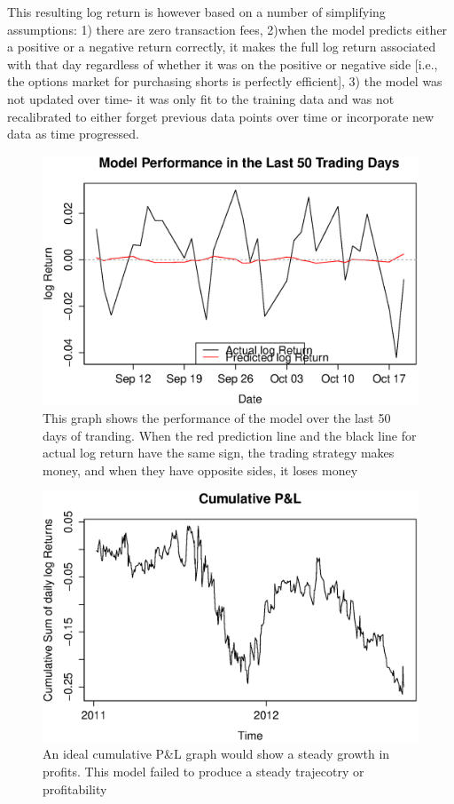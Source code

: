 \documentclass{article}
\begin{document}
This resulting log return is however based on a number of simplifying assumptions: 1) there are zero transaction fees, 2)when the model predicts either a positive or a negative return correctly, it makes the full log return associated with that day regardless of whether it was on the positive or negative side [i.e., the options market for purchasing shorts is perfectly efficient], 3) the model was not updated over time- it was only fit to the training data and was not recalibrated to either forget previous data points over time or incorporate new data as time progressed.

\begin{figure}[H]
\begin{center}
\includegraphics[width=1\columnwidth]{performance.eps}
\caption{This graph shows the performance of the model over the last 50 days of tranding.  When the red prediction line and the black line for actual log return have the same sign, the trading strategy makes money, and when they have opposite sides, it loses money}
\end{center}
\end{figure}


\begin{figure}[H]
\begin{center}
\includegraphics[width=1\columnwidth]{pl.eps}
\caption{An ideal cumulative P&L graph would show a steady growth in profits.  This model failed to produce a steady trajecotry or profitability}
\end{center}
\end{figure}
\end{document}
